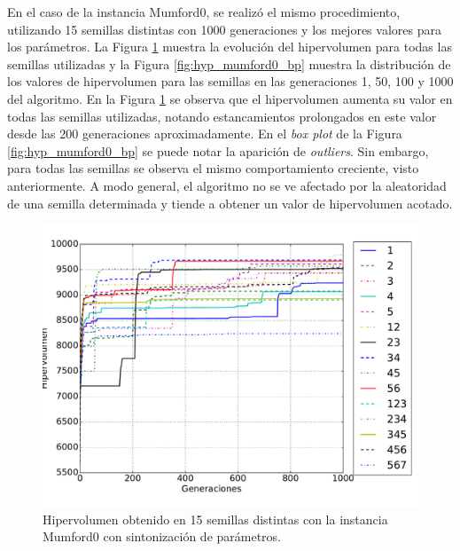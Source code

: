 En el caso de la instancia Mumford0, se realizó el mismo procedimiento, utilizando 15 semillas distintas con 1000 generaciones y los mejores valores  para los parámetros. La Figura \ref{fig:hyp_mumford0} muestra la evolución del hipervolumen para todas las semillas utilizadas y la Figura \ref{fig:hyp_mumford0_bp} muestra la distribución de los valores de hipervolumen para las semillas en las generaciones 1, 50, 100 y 1000 del algoritmo. En la Figura \ref{fig:hyp_mumford0} se observa que el hipervolumen aumenta su valor en todas las semillas utilizadas, notando estancamientos prolongados en este valor desde las 200 generaciones aproximadamente. En el \textit{box plot} de la Figura \ref{fig:hyp_mumford0_bp} se puede notar la aparición de \textit{outliers}. Sin embargo, para todas las semillas se observa el mismo comportamiento creciente, visto anteriormente. A modo general, el algoritmo no se ve afectado por la aleatoridad de una semilla determinada y tiende a obtener un valor de hipervolumen acotado.

\begin{figure}[!htb]
\centering
\includegraphics[width=\textwidth]{img/hyp_Mumford0}
\caption{Hipervolumen obtenido en 15 semillas distintas con la instancia Mumford0 con sintonización de parámetros.}
\label{fig:hyp_mumford0}
\end{figure}

